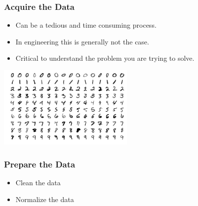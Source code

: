 \documentclass{beamer}
\begin{document}
\begin{frame}

    \frametitle{Acquire the Data}

    \begin{itemize}
        \item Can be a tedious and time consuming process.
        \item In engineering this is generally not the case.
        \item Critical to understand the problem you are trying to solve.
    \end{itemize}

    \begin{center}
        \includegraphics[height=4cm]{figs/mnist_examples.png}
    \end{center}

\end{frame}


\begin{frame}

    \frametitle{Prepare the Data}

    \begin{itemize}
        \item Clean the data
        \item Normalize the data
    \end{itemize}

\end{frame}
\end{document}
